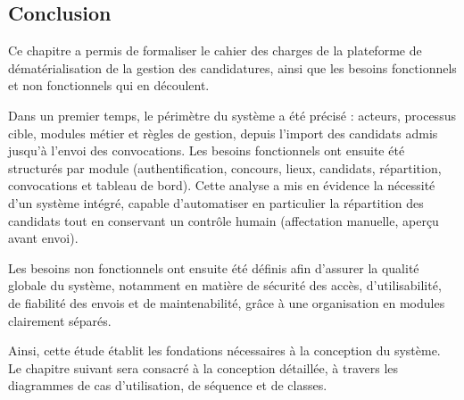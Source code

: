 \begin{onehalfspace}
\section{Conclusion}

Ce chapitre a permis de formaliser le cahier des charges de la plateforme de dématérialisation de la gestion des candidatures, ainsi que les besoins fonctionnels et non fonctionnels qui en découlent.

Dans un premier temps, le périmètre du système a été précisé : acteurs, processus cible, modules métier et règles de gestion, depuis l'import des candidats admis jusqu'à l'envoi des convocations. Les besoins fonctionnels ont ensuite été structurés par module (authentification, concours, lieux, candidats, répartition, convocations et tableau de bord). Cette analyse a mis en évidence la nécessité d'un système intégré, capable d'automatiser en particulier la répartition des candidats tout en conservant un contrôle humain (affectation manuelle, aperçu avant envoi).

Les besoins non fonctionnels ont ensuite été définis afin d'assurer la qualité globale du système, notamment en matière de sécurité des accès, d'utilisabilité, de fiabilité des envois et de maintenabilité, grâce à une organisation en modules clairement séparés.

Ainsi, cette étude établit les fondations nécessaires à la conception du système. Le chapitre suivant sera consacré à la conception détaillée, à travers les diagrammes de cas d'utilisation, de séquence et de classes.

\end{onehalfspace}

